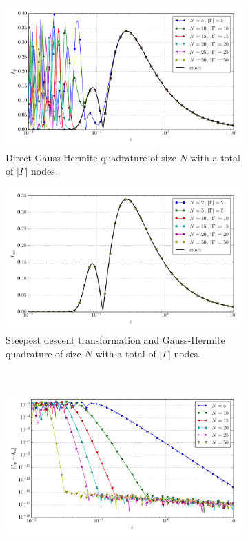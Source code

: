 \documentclass[a4paper,10pt]{article}
\begin{document}
\begin{figure}[ht!]
  \begin{subfigure}[t]{0.5\linewidth}
    \includegraphics[width=\linewidth]{./plots/tp_1d_conv_eps_2_1_val_qr.pdf}
    \caption{Direct Gauss-Hermite quadrature of size $N$ with a total of $|\Gamma|$ nodes.}
    \label{fig:tp_1d_conv_eps_2_1_val_qr}
  \end{subfigure}
  \begin{subfigure}[t]{0.5\linewidth}
    \includegraphics[width=\linewidth]{./plots/tp_1d_conv_eps_2_1_val_nsd.pdf}
    \caption{Steepest descent transformation and Gauss-Hermite quadrature of size $N$ with a total of $|\Gamma|$ nodes.}
    \label{fig:tp_1d_conv_eps_2_1_val_nsd}
  \end{subfigure} \\
  \begin{subfigure}[t]{0.5\linewidth}
    \includegraphics[width=\linewidth]{./plots/tp_1d_conv_eps_2_1_err_qr.pdf}

\end{subfigure}
\end{figure}
\end{document}
